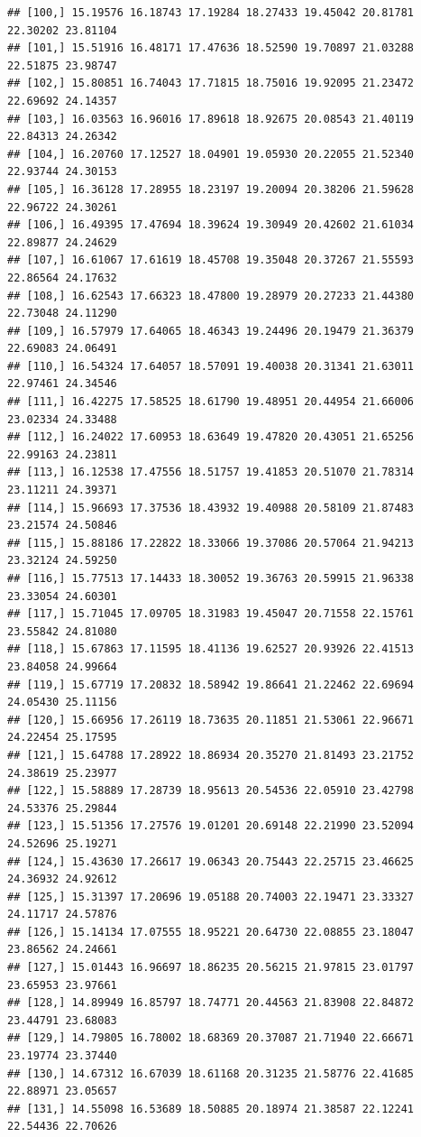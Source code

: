 \documentclass{article}\usepackage[]{graphicx}\usepackage[]{color}
\makeatletter
\newenvironment{kframe}{%
 \def\at@end@of@kframe{}%
 \ifinner\ifhmode%
  \def\at@end@of@kframe{\end{minipage}}%
  \begin{minipage}{\columnwidth}%
 \fi\fi%
 \def\FrameCommand##1{\hskip\@totalleftmargin \hskip-\fboxsep
 \colorbox{shadecolor}{##1}\hskip-\fboxsep
     \hskip-\linewidth \hskip-\@totalleftmargin \hskip\columnwidth}%
 \MakeFramed {\advance\hsize-\width
   \@totalleftmargin\z@ \linewidth\hsize
   \@setminipage}}%
 {\par\unskip\endMakeFramed%
 \at@end@of@kframe}
\newenvironment{knitrout}{}{} %
\makeatother
\begin{document}
\begin{knitrout}
\begin{kframe}
\begin{verbatim}
## [100,] 15.19576 16.18743 17.19284 18.27433 19.45042 20.81781 22.30202 23.81104
## [101,] 15.51916 16.48171 17.47636 18.52590 19.70897 21.03288 22.51875 23.98747
## [102,] 15.80851 16.74043 17.71815 18.75016 19.92095 21.23472 22.69692 24.14357
## [103,] 16.03563 16.96016 17.89618 18.92675 20.08543 21.40119 22.84313 24.26342
## [104,] 16.20760 17.12527 18.04901 19.05930 20.22055 21.52340 22.93744 24.30153
## [105,] 16.36128 17.28955 18.23197 19.20094 20.38206 21.59628 22.96722 24.30261
## [106,] 16.49395 17.47694 18.39624 19.30949 20.42602 21.61034 22.89877 24.24629
## [107,] 16.61067 17.61619 18.45708 19.35048 20.37267 21.55593 22.86564 24.17632
## [108,] 16.62543 17.66323 18.47800 19.28979 20.27233 21.44380 22.73048 24.11290
## [109,] 16.57979 17.64065 18.46343 19.24496 20.19479 21.36379 22.69083 24.06491
## [110,] 16.54324 17.64057 18.57091 19.40038 20.31341 21.63011 22.97461 24.34546
## [111,] 16.42275 17.58525 18.61790 19.48951 20.44954 21.66006 23.02334 24.33488
## [112,] 16.24022 17.60953 18.63649 19.47820 20.43051 21.65256 22.99163 24.23811
## [113,] 16.12538 17.47556 18.51757 19.41853 20.51070 21.78314 23.11211 24.39371
## [114,] 15.96693 17.37536 18.43932 19.40988 20.58109 21.87483 23.21574 24.50846
## [115,] 15.88186 17.22822 18.33066 19.37086 20.57064 21.94213 23.32124 24.59250
## [116,] 15.77513 17.14433 18.30052 19.36763 20.59915 21.96338 23.33054 24.60301
## [117,] 15.71045 17.09705 18.31983 19.45047 20.71558 22.15761 23.55842 24.81080
## [118,] 15.67863 17.11595 18.41136 19.62527 20.93926 22.41513 23.84058 24.99664
## [119,] 15.67719 17.20832 18.58942 19.86641 21.22462 22.69694 24.05430 25.11156
## [120,] 15.66956 17.26119 18.73635 20.11851 21.53061 22.96671 24.22454 25.17595
## [121,] 15.64788 17.28922 18.86934 20.35270 21.81493 23.21752 24.38619 25.23977
## [122,] 15.58889 17.28739 18.95613 20.54536 22.05910 23.42798 24.53376 25.29844
## [123,] 15.51356 17.27576 19.01201 20.69148 22.21990 23.52094 24.52696 25.19271
## [124,] 15.43630 17.26617 19.06343 20.75443 22.25715 23.46625 24.36932 24.92612
## [125,] 15.31397 17.20696 19.05188 20.74003 22.19471 23.33327 24.11717 24.57876
## [126,] 15.14134 17.07555 18.95221 20.64730 22.08855 23.18047 23.86562 24.24661
## [127,] 15.01443 16.96697 18.86235 20.56215 21.97815 23.01797 23.65953 23.97661
## [128,] 14.89949 16.85797 18.74771 20.44563 21.83908 22.84872 23.44791 23.68083
## [129,] 14.79805 16.78002 18.68369 20.37087 21.71940 22.66671 23.19774 23.37440
## [130,] 14.67312 16.67039 18.61168 20.31235 21.58776 22.41685 22.88971 23.05657
## [131,] 14.55098 16.53689 18.50885 20.18974 21.38587 22.12241 22.54436 22.70626

\end{verbatim}
\end{kframe}
\end{knitrout}
\end{document}
